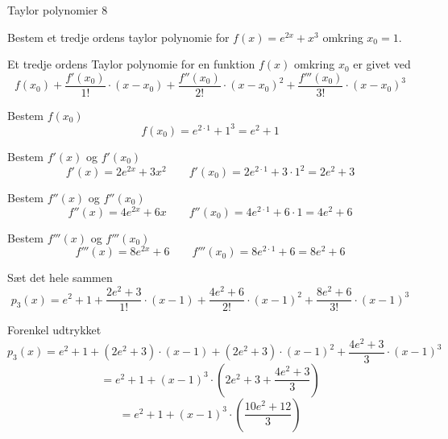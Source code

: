 \documentclass{article}
\begin{document}
\begin{exercise}{Taylor polynomier 8}

Bestem et tredje ordens taylor polynomie for $f(x) = e^{2x} + x^3$
omkring $x_0 = 1$.


\hint
Et tredje ordens Taylor polynomie for en funktion $f(x)$
omkring $x_0$ er givet ved
\[
f(x_0) + \frac{f'(x_0)}{1!} \cdot (x - x_0)
+ \frac{f''(x_0)}{2!} \cdot (x - x_0)^2
+ \frac{f'''(x_0)}{3!} \cdot (x - x_0)^3
\]


\hint
Bestem $f(x_0)$
\[
f(x_0) = e^{2 \cdot 1} + 1^3 = e^2 + 1
\]

\hint
Bestem $f'(x)$ og $f'(x_0)$
\[
f'(x) = 2 e^{2x} + 3x^2 \qquad f'(x_0)= 2e^{2 \cdot 1} + 3 \cdot 1^2 = 2e^2 + 3
\]

\hint
Bestem $f''(x)$ og $f''(x_0)$
\[
f''(x) = 4e^{2x} + 6x \qquad f''(x_0) = 4e^{2 \cdot 1} + 6 \cdot 1 = 4e^2 + 6
\]

\hint
Bestem $f'''(x)$ og $f'''(x_0)$
\[
f'''(x) = 8 e^{2x} + 6 \qquad f'''(x_0) = 8e^{2 \cdot 1} + 6 = 8e^2 + 6
\]

\hint
Sæt det hele sammen
\[
p_3(x) = e^2 + 1 + \frac{2e^2 + 3}{1!} \cdot (x - 1) + \frac{4e^2 + 6}{2!} \cdot (x - 1)^2 + \frac{8e^2 + 6}{3!} \cdot (x - 1)^3
\]

\hint
Forenkel udtrykket
\[
p_3(x) = e^2 + 1 + (2e^2 + 3) \cdot (x - 1) + (2e^2 + 3) \cdot (x - 1)^2 + \frac{4e^2 + 3}{3} \cdot (x - 1)^3
\]
\[
 = e^2 + 1 + (x - 1)^3 \cdot \left(2e^2 + 3 + \frac{4e^2 + 3}{3} \right)
\]
\[
 = e^2 + 1 + (x - 1)^3 \cdot \left( \frac{10e^2 + 12}{3} \right)
\]

\end{exercise}
\end{document}
